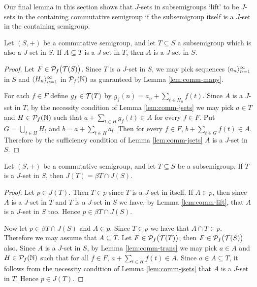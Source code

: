 Our final lemma in this section shows that $J$-sets in subsemigroups `lift' to be $J$-sets in the containing commutative semigroup if the subsemigroup itself is a $J$-set in the containing semigroup.

\begin{lem}
  \label{lem:comm-lift}
  Let $(S, +)$ be a commutative semigroup, and let $T \subseteq S$ a subsemigroup which is also a $J$-set in $S$.
  If $A \subseteq T$ is a $J$-set in $T$, then $A$ is a $J$-set in $S$. 
\end{lem}
\begin{proof}
  Let $F \in \mathcal{P}_f\bigl( \mathcal{T}(S) \bigr)$. 
  Since $T$ is a $J$-set in $S$, we may pick sequences $\langle a_n \rangle_{n=1}^\infty$ in $S$ and $\langle H_n \rangle_{n=1}^\infty$ in $\mathcal{P}_f(\mathbb{N})$ as guaranteed by Lemma \ref{lem:comm-many}.

  For each $f \in F$ define $g_f \in \mathcal{T}(T)$ by $g_f(n) = a_n + \sum_{t \in H_n} f(t)$. 
  Since $A$ is a $J$-set in $T$, by the necessity condition of Lemma \ref{lem:comm-jsets} we may pick $a \in T$ and $H \in \mathcal{P}_f(\mathbb{N})$ such that $a + \sum_{t \in H} g_f(t) \in A$ for every $f \in F$. 
  Put $G = \bigcup_{t \in H} H_t$ and $b = a + \sum_{t \in H} a_t$. 
  Then for every $f \in F$, $b + \sum_{t \in G} f(t) \in A$. 
  Therefore by the sufficiency condition of Lemma \ref{lem:comm-jsets} $A$ is a $J$-set in $S$.
\end{proof}

\begin{thm}
  \label{thm:comm-main}
  Let $(S,+)$ be a commutative semigroup, and let $T \subseteq S$ be a subsemigroup.
  If $T$ is a $J$-set in $S$, then $J(T) = \beta T \cap J(S)$.
\end{thm}
\begin{proof}
  Let $p \in J(T)$. 
  Then $T \in p$ since $T$ is a $J$-set in itself.
  If $A \in p$, then since $A$ is a $J$-set in $T$ and $T$ is a $J$-set in $S$ we have, by Lemma \ref{lem:comm-lift}, that $A$ is a $J$-set in $S$ too.
  Hence $p \in \beta T \cap J(S)$. 

  Now let $p \in \beta T \cap J(S)$ and $A \in p$. 
  Since $T \in p$ we have that $A \cap T \in p$.
  Therefore we may assume that $A \subseteq T$. 
  Let $F \in \mathcal{P}_f\bigl( \mathcal{T}(T) \bigr)$, then $F \in \mathcal{P}_f\bigl( \mathcal{T}(S) \bigr)$ also.
  Since $A$ is a $J$-set in $S$, by Lemma \ref{lem:comm-trans} we may pick $a \in A$ and $H \in \mathcal{P}_f(\mathbb{N})$ such that for all $f \in F$, $a + \sum_{t \in H} f(t) \in A$.
  Since $a \in A \subseteq T$, it follows from the necessity condition of Lemma \ref{lem:comm-jsets} that $A$ is a $J$-set in $T$.
  Hence $p \in J(T)$.
\end{proof}

